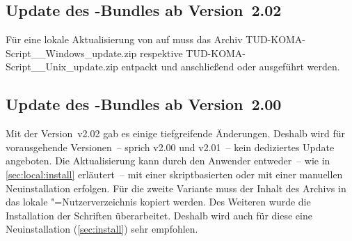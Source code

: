 \subsection{Update des \TUDScript-Bundles ab Version~2.02}
Für eine lokale Aktualisierung von \TUDScript auf \vTUDScript{} muss das Archiv
%
{TUD-KOMA-Script\_\vTUDScript\_Windows\_update.zip} respektive 
%
{TUD-KOMA-Script\_\vTUDScript\_Unix\_update.zip} entpackt und anschließend
 oder 
 ausgeführt werden.

\subsection{Update des \TUDScript-Bundles ab Version~2.00}
Mit der Version~v2.02 gab es einige tiefgreifende Änderungen. Deshalb wird für 
vorausgehende Versionen~-- sprich v2.00 und v2.01~-- kein dediziertes Update 
angeboten. Die Aktualisierung kann durch den Anwender entweder~-- wie in 
\autoref{sec:local:install} erläutert~-- mit einer skriptbasierten oder mit 
einer manuellen Neuinstallation erfolgen. Für die zweite Variante muss 
der Inhalt des Archivs
%
{} in das lokale "=Nutzerverzeichnis 
kopiert werden. Des Weiteren wurde die Installation der Schriften überarbeitet. 
Deshalb wird auch für diese eine Neuinstallation (\autoref{sec:install}) sehr 
empfohlen.


